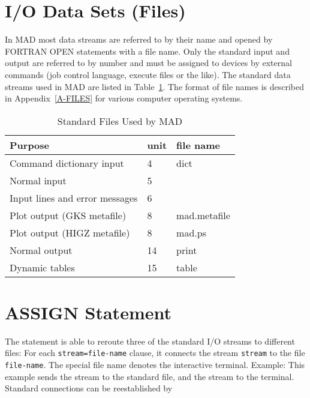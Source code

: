 \section{I/O Data Sets (Files)}
In MAD most data streams are referred to by their name
and opened by FORTRAN OPEN statements with a file name.
Only the standard input and output are referred to by number
and must be assigned to devices by external commands
(job control language, execute files or the like).
The standard data streams used in MAD are listed in
Table~\ref{T-FILE}.
The format of file names is described in Appendix~\ref{A-FILES}
for various computer operating systems.
\begin{table}[ht]
\caption{Standard Files Used by MAD}
\vspace{1ex}
\label{T-FILE}
\centering
\begin{tabular}{|l|l|l|}
   \hline
   Purpose                         &unit  &file name \\
   \hline
   Command dictionary input        & 4    &dict \\
   Normal input                    & 5    & \\
   Input lines and error messages  & 6    & \\
   Plot output (GKS metafile)      & 8    &mad.metafile \\
   Plot output (HIGZ metafile)     & 8    &mad.ps \\
   Normal output                   &14    &print \\
   Dynamic tables                  &15    &table \\
   \hline
\end{tabular}
\end{table}
 
\section{ASSIGN Statement}
\label{S-ASSIGN}
The  statement is able to reroute three of the standard
I/O streams to different files:
For each {\tt stream=file-name} clause,
it connects the stream {\tt stream} to the file {\tt file-name}.
The special file name  denotes the interactive terminal.
Example:
This example sends the  stream
to the standard  file,
and the  stream to the terminal.
Standard connections can be reestablished by
 
